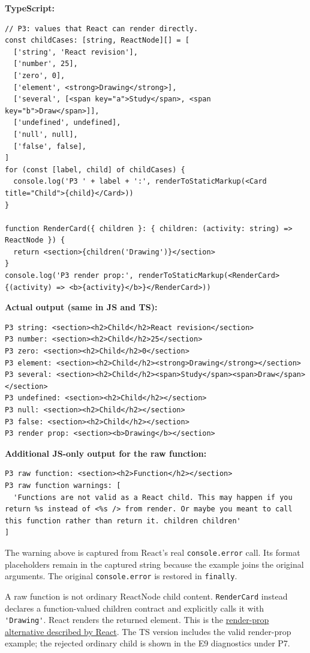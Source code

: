 \documentclass[
  11pt,
]{article}
\newcommand{\passthrough}[1]{#1}
\begin{document}
\textbf{TypeScript:}

\begin{lstlisting}
// P3: values that React can render directly.
const childCases: [string, ReactNode][] = [
  ['string', 'React revision'],
  ['number', 25],
  ['zero', 0],
  ['element', <strong>Drawing</strong>],
  ['several', [<span key="a">Study</span>, <span key="b">Draw</span>]],
  ['undefined', undefined],
  ['null', null],
  ['false', false],
]
for (const [label, child] of childCases) {
  console.log('P3 ' + label + ':', renderToStaticMarkup(<Card title="Child">{child}</Card>))
}

function RenderCard({ children }: { children: (activity: string) => ReactNode }) {
  return <section>{children('Drawing')}</section>
}
console.log('P3 render prop:', renderToStaticMarkup(<RenderCard>{(activity) => <b>{activity}</b>}</RenderCard>))
\end{lstlisting}

\textbf{Actual output (same in JS and TS):}

\begin{lstlisting}
P3 string: <section><h2>Child</h2>React revision</section>
P3 number: <section><h2>Child</h2>25</section>
P3 zero: <section><h2>Child</h2>0</section>
P3 element: <section><h2>Child</h2><strong>Drawing</strong></section>
P3 several: <section><h2>Child</h2><span>Study</span><span>Draw</span></section>
P3 undefined: <section><h2>Child</h2></section>
P3 null: <section><h2>Child</h2></section>
P3 false: <section><h2>Child</h2></section>
P3 render prop: <section><b>Drawing</b></section>
\end{lstlisting}

\textbf{Additional JS-only output for the raw function:}

\begin{lstlisting}
P3 raw function: <section><h2>Function</h2></section>
P3 raw function warnings: [
  'Functions are not valid as a React child. This may happen if you return %s instead of <%s /> from render. Or maybe you meant to call this function rather than return it. children children'
]
\end{lstlisting}

The warning above is captured from React's real
\passthrough{\lstinline!console.error!} call. Its format placeholders
remain in the captured string because the example joins the original
arguments. The original \passthrough{\lstinline!console.error!} is
restored in \passthrough{\lstinline!finally!}.

A raw function is not ordinary ReactNode child content.
\passthrough{\lstinline!RenderCard!} instead declares a function-valued
children contract and explicitly calls it with
\passthrough{\lstinline!'Drawing'!}. React renders the returned element.
This is the
\href{https://react.dev/reference/react/Children\#calling-a-render-prop-to-customize-rendering}{render-prop
alternative described by React}. The TS version includes the valid
render-prop example; the rejected ordinary child is shown in the E9
diagnostics under P7.
\end{document}
